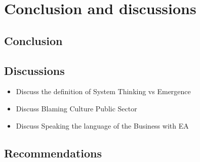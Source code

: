 \chapter{Conclusion and discussions}
\label{ch:conclusionanddiscussions}

\lipsum[1]




\section{Conclusion}
\label{sec:conclusion}

\lipsum[1]

\section{Discussions}
\label{sec:discussions}

\begin{itemize}
	\item{Discuss the definition of System Thinking vs Emergence}
	\item{Discuss Blaming Culture Public Sector}
	\item{Discuss Speaking the language of the Business with EA}
\end{itemize}

\section{Recommendations}
\label{sec:reccomandations}

\lipsum[1]
